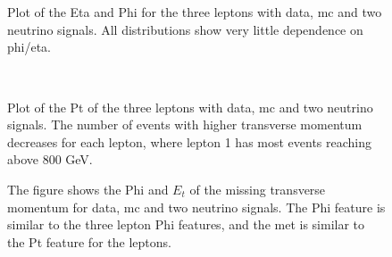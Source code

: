 \documentclass[a4paper, american, 12pt]{report}
\begin{document}
	\begin{figure}[h!]
		\vspace*{-4.5cm}
		\hspace*{-1.cm}
		\\
		\hspace*{-1.cm}
		\\
		\hspace*{-1.cm}
		\caption[Eta and Phi plots for the three leptons.]{Plot of the Eta and Phi for the three leptons with data, \acrshort{mc} and two neutrino signals. All distributions show very little dependence on phi/eta. \label{fig:Eta_Phi}}
	\end{figure}

	\begin{figure}[htb!]
		\hspace*{-1.cm}
		\\
		\hspace*{3.cm}
		\caption[Pt plots for the three leptons.]{Plot of the Pt of the three leptons with data, \acrshort{mc} and two neutrino signals. The number of events with higher transverse momentum decreases for each lepton, where lepton 1 has most events reaching above 800 GeV. \label{fig:Pt_orig}}
	\end{figure}

	\begin{figure}[htb!]
		\hspace*{-0.8cm}
		\caption[Phi and missing transverse momentum plots for the neutrino.]{The figure shows the Phi and $E_t$ of the missing transverse momentum for data, \acrshort{mc} and two neutrino signals. The Phi feature is similar to the three lepton Phi features, and the \acrshort{met} is similar to the Pt feature for the leptons. \label{fig:MET_orig}}
	\end{figure}
\end{document}
